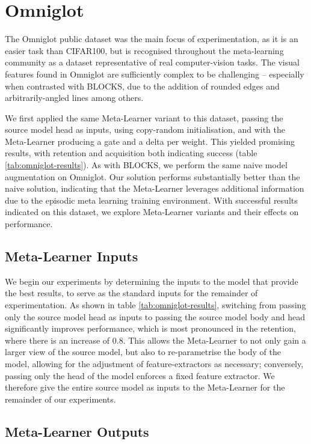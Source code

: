 \documentclass{report}
\begin{document}
\section{Omniglot}
The Omniglot\parencite{omniglot} public dataset was the main focus of experimentation, as it is an easier task than CIFAR100, but is recognised throughout the meta-learning community as a dataset representative of real computer-vision tasks. The visual features found in Omniglot are sufficiently complex to be challenging -- especially when contrasted with BLOCKS, due to the addition of rounded edges and arbitrarily-angled lines among others. \par
We first applied the same Meta-Learner variant to this dataset, passing the source model head as inputs, using copy-random initialisation, and with the Meta-Learner producing a gate and a delta per weight. This yielded promising results, with retention and acquisition both indicating success (table \ref{tab:omniglot-results}). As with BLOCKS, we perform the same naive model augmentation on Omniglot. Our solution performs substantially better than the naive solution, indicating that the Meta-Learner leverages additional information due to the episodic meta learning training environment. With successful results indicated on this dataset, we explore Meta-Learner variants and their effects on performance. \par

\subsection{Meta-Learner Inputs}
We begin our experiments by determining the inputs to the model that provide the best results, to serve as the standard inputs for the remainder of experimentation. As shown in table \ref{tab:omniglot-results}, switching from passing only the source model head as inputs to passing the source model body and head significantly improves performance, which is most pronounced in the retention, where there is an increase of $0.8$. This allows the Meta-Learner to not only gain a larger view of the source model, but also to re-parametrise the body of the model, allowing for the adjustment of feature-extractors as necessary; conversely, passing only the head of the model enforces a fixed feature extractor. We therefore give the entire source model as inputs to the Meta-Learner for the remainder of our experiments. 

\subsection{Meta-Learner Outputs}
\end{document}
